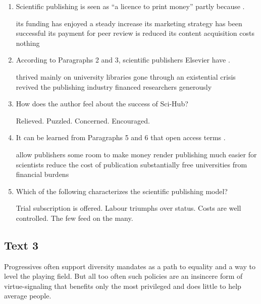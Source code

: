 \begin{enumerate}[resume]
	\item
Scientific publishing is seen as ``a licence to print money'' partly
because \lineread.


\fourchoices
{its funding has enjoyed a steady increase}
{its marketing strategy has been successful}
{its payment for peer review is reduced}
{its content acquisition costs nothing}


\item
According to Paragraphs 2 and 3, scientific publishers Elsevier have \lineread.


\fourchoices
{thrived mainly on university libraries}
{gone through an existential crisis}
{revived the publishing industry}
{financed researchers generously}


\item
How does the author feel about the success of Sci-Hub?


\fourchoices
{Relieved.}
{Puzzled.}
{Concerned.}
{Encouraged.}


\item
 It can be learned from Paragraphs 5 and 6 that open access terms \lineread.


\fourchoices
{allow publishers some room to make money}
{render publishing much easier for scientists}
{reduce the cost of publication substantially}
{free universities from financial burdens}


\item
Which of the following characterizes the scientific publishing
model?


\fourchoices
{Trial subscription is offered.}
{Labour triumphs over status.}
{Costs are well controlled.}
{The few feed on the many.}


\end{enumerate}


\newpage
\subsection{Text 3}


Progressives often support diversity mandates as a path to equality and
a way to level the playing field. But all too often such policies are an
insincere form of virtue-signaling that benefits only the most
privileged and does little to help average people.

